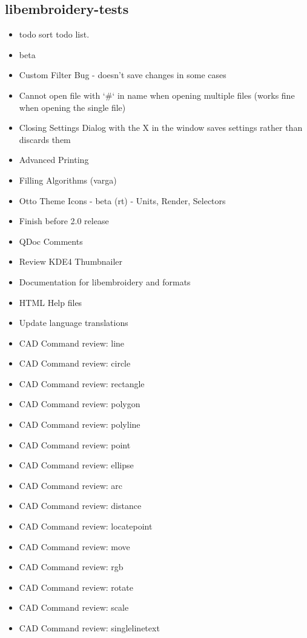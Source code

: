 \subsection{libembroidery-tests}

\begin{itemize}
\item todo sort todo list.
\item beta
  \item Custom Filter Bug - doesn't save changes in some cases
  \item Cannot open file with `\#` in name when opening multiple files (works fine when opening the single file)
  \item Closing Settings Dialog with the X in the window saves settings rather than discards them
  \item Advanced Printing
  \item Filling Algorithms (varga)
  \item Otto Theme Icons - beta (rt) - Units, Render, Selectors
\item Finish before 2.0 release
  \item QDoc Comments
  \item Review KDE4 Thumbnailer
  \item Documentation for libembroidery and formats
  \item HTML Help files
  \item Update language translations
  \item CAD Command review: line
  \item CAD Command review: circle
  \item CAD Command review: rectangle
  \item CAD Command review: polygon
  \item CAD Command review: polyline
  \item CAD Command review: point
  \item CAD Command review: ellipse
  \item CAD Command review: arc
  \item CAD Command review: distance
  \item CAD Command review: locatepoint
  \item CAD Command review: move
  \item CAD Command review: rgb
  \item CAD Command review: rotate
  \item CAD Command review: scale
  \item CAD Command review: singlelinetext

\end{itemize}
